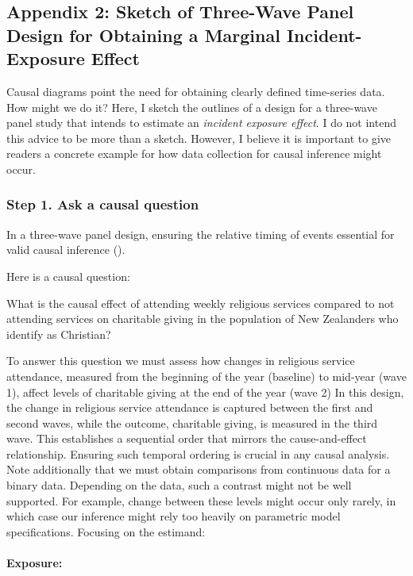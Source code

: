 \documentclass[
  singlecolumn]{article}
\let\oldparagraph\paragraph
\renewcommand{\paragraph}[1]{\oldparagraph{#1}\mbox{}}
\begin{document}
\subsection{Appendix 2: Sketch of Three-Wave Panel Design for Obtaining
a Marginal Incident-Exposure
Effect}\label{appendix-2-sketch-of-three-wave-panel-design-for-obtaining-a-marginal-incident-exposure-effect}

Causal diagrams point the need for obtaining clearly defined time-series
data. How might we do it? Here, I sketch the outlines of a design for a
three-wave panel study that intends to estimate an \emph{incident
exposure effect}. I do not intend this advice to be more than a sketch.
However, I believe it is important to give readers a concrete example
for how data collection for causal inference might occur.

\subsubsection{Step 1. Ask a causal
question}\label{step-1.-ask-a-causal-question}

In a three-wave panel design, ensuring the relative timing of events
essential for valid causal inference
().

Here is a causal question:

What is the causal effect of attending weekly religious services
compared to not attending services on charitable giving in the
population of New Zealanders who identify as Christian?

To answer this question we must assess how changes in religious service
attendance, measured from the beginning of the year (baseline) to
mid-year (wave 1), affect levels of charitable giving at the end of the
year (wave 2) In this design, the change in religious service attendance
is captured between the first and second waves, while the outcome,
charitable giving, is measured in the third wave. This establishes a
sequential order that mirrors the cause-and-effect relationship.
Ensuring such temporal ordering is crucial in any causal analysis. Note
additionally that we must obtain comparisons from continuous data for a
binary data. Depending on the data, such a contrast might not be well
supported. For example, change between these levels might occur only
rarely, in which case our inference might rely too heavily on parametric
model specifications. Focusing on the estimand:

\paragraph{Exposure:}\label{exposure}
\end{document}
